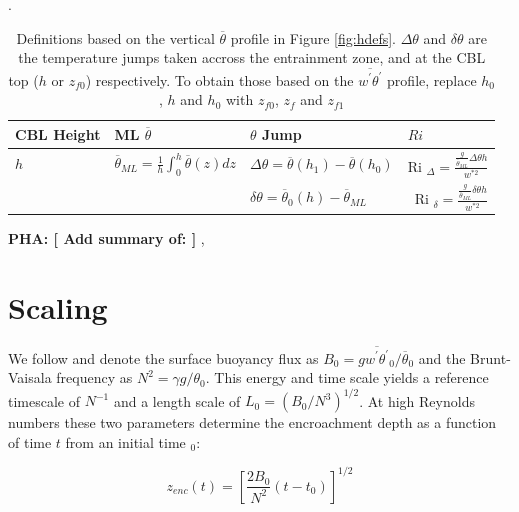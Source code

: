\documentclass[referee]{svjour3}
\newcommand{\remarkpha}[1]{{ \bf PHA:  [ \footnotesize #1 ]}}
\begin{document}
\begin{table}[htbp]
  \caption[Height definitions]{Definitions based on the vertical $\overline{\theta}$ profile in Figure \ref{fig:hdefs}. $\Delta \theta$ and $\delta \theta$ are the temperature jumps taken accross the entrainment zone, and at the CBL top ($h$ or $z_{f0}$) respectively. To obtain those based on the $\overline{w^{'}\theta^{'}}$ profile, replace $h_{0}$, $h$ and $h_{0}$ with $z_{f0}$, $z_{f}$ and $z_{f1}$}.


    \begin{tabular}{p{} p{} p{3cm} p{2.5cm}}
    
      CBL Height & ML $\overline{\theta}$ & $\theta$ Jump &$     Ri $\\ \hline 
       $h$ & $\overline{\theta}_{ML} = \frac{1}{h}\int^{h}_{0}\overline{\theta}(z)dz$ & $\Delta \theta=\overline{\theta}(h_{1})-\overline{\theta}(h_{0})$ &      Ri $_{\Delta}=\frac{\frac{g}{\overline{\theta}_{ML}}\Delta \theta h}{w^{*2}}$  \\ [.3cm] 
        
       & &$\delta \theta = \overline{\theta}_{0}(h)- \overline{\theta}_{ML}$ & \    Ri $_{\delta}=\frac{\frac{g}{\overline{\theta}_{ML}} \delta \theta h}{w^{*2}}$ \\ \hline
      \end{tabular}

\label{tab:reldefs}   
    
\end{table}


\remarkpha{Add summary of: } \citet{Brooks12}, \citet{Fedorovich04}


\section{Scaling}


We follow \citep{Garcia14} and denote the surface buoyancy flux as $B_0 = g \overline{w^{'}\theta^{'}}_0/\overline{\theta}_0$ and the Brunt-Vaisala frequency as $N^2 = \gamma g/\theta_0$.
This energy and time scale yields a reference timescale of $N^{-1}$ and a length scale of $L_0=(B_0/N^3)^{1/2}$.  At high Reynolds numbers these two parameters determine the encroachment
depth as a function of time $t$ from an initial time $_0$:

\begin{equation}
  \label{eq:enc}
  z_{enc}(t) = \left [ \frac{2B_0}{N^2} (t - t_0) \right ]^{1/2}
\end{equation}
\end{document}
